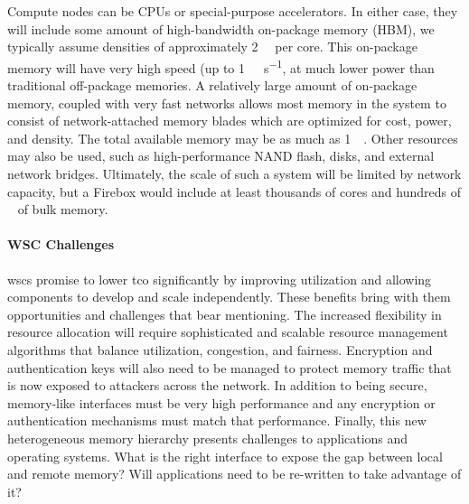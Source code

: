 Compute nodes can be CPUs or special-purpose accelerators. In either case, they
will include some amount of high-bandwidth on-package memory (HBM), we
typically assume densities of approximately \SI{2}{\giga\byte} per core. This
on-package memory will have very high speed (up to
\SI{1}{\tera\byte\per\second}, at much lower power than traditional off-package
memories. A relatively large amount of on-package memory, coupled with very
fast networks allows most memory in the system to consist of network-attached memory
blades which are optimized for cost, power, and density. The total available
memory may be as much as \SI{1}{\peta\byte}. Other resources may also be used,
such as high-performance NAND flash, disks, and external network bridges.
Ultimately, the scale of such a system will be limited by network capacity, but
a Firebox would include at least thousands of cores and hundreds of
\si{\tera\byte} of bulk memory.

\paragraph{WSC Challenges}
\Glspl{wsc} promise to lower \gls{tco} significantly by improving utilization
and allowing components to develop and scale independently. These benefits
bring with them opportunities and challenges that bear mentioning. The
increased flexibility in resource allocation will require sophisticated and
scalable resource management algorithms that balance utilization, congestion,
and fairness. Encryption and authentication keys will also need to be managed
to protect memory traffic that is now exposed to attackers across the network.
In addition to being secure, memory-like interfaces must be very high
performance and any encryption or authentication mechanisms must match that
performance. Finally, this new heterogeneous memory hierarchy presents
challenges to applications and operating systems. What is the right interface
to expose the gap between local and remote memory? Will applications need to be
re-written to take advantage of it?
